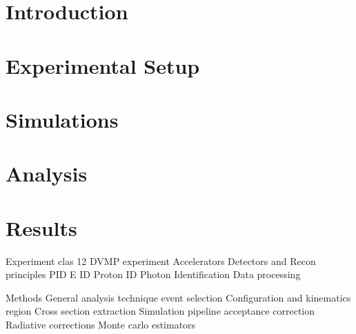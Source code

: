\documentclass[12pt,twoside]{mitthesis}
\begin{document}

% 
\pagestyle{plain}
\tableofcontents
{}




\chapter{Introduction} \label{Chapter:Intro}


\chapter{Experimental Setup} \label{Chapter:Experiment}


\chapter{Simulations} \label{Chapter:Simulations}


\chapter{Analysis} \label{Chapter:Analysis}


\chapter{Results} \label{Chapter:Results}




Experiment
clas 12 DVMP experiment
Accelerators
Detectors and Recon principles
PID
E ID
Proton ID
Photon Identification
Data processing 

Methods
General analysis technique
event selection
Configuration and kinematics region
Cross section extraction
Simulation pipeline
acceptance correction
Radiative corrections
Monte carlo estimators
\end{document}

